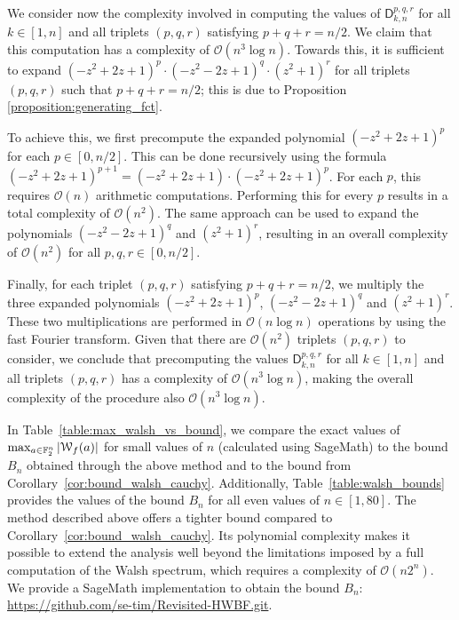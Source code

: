 \documentclass{llncs}
\begin{document}
We consider now the complexity involved in computing the values of $\mathsf{D}_{k,n}^{p,q,r}$ for all $k\in[1,n]$ and all triplets $(p,q,r)$ satisfying $p+q+r=n/2$. We claim that this computation has a complexity of $\mathcal{O}(n^3 \log n)$. Towards this, it is sufficient to expand $(-z^2 + 2z + 1)^p \cdot (-z^2 - 2z + 1)^q \cdot (z^2 + 1)^r$ for all triplets $(p,q,r)$ such that $p+q+r=n/2$; this is due to Proposition \ref{proposition:generating_fct}.

To achieve this, we first precompute the expanded polynomial $(-z^2 + 2z + 1)^p$ for each $p\in[0,n/2]$. This can be done recursively using the formula $(-z^2 + 2z + 1)^{p+1} = (-z^2 + 2z + 1) \cdot (-z^2 + 2z + 1)^p$. For each $p$, this requires $\mathcal O(n)$ arithmetic computations. Performing this for every $p$ results in a total complexity of $\mathcal{O}(n^2)$. The same approach can be used to expand the polynomials $(-z^2 - 2z + 1)^q$ and $(z^2 + 1)^r$, resulting in an overall complexity of $\mathcal{O}(n^2)$ for all $p,q,r\in[0,n/2]$. 

Finally, for each triplet $(p,q,r)$ satisfying $p+q+r=n/2$, we multiply the three expanded polynomials $(-z^2 + 2z + 1)^p$, $(-z^2 - 2z + 1)^q$ and $(z^2 + 1)^r$. These two multiplications are performed in $\mathcal{O}(n \log n)$ operations by using the fast Fourier transform. Given that there are $\mathcal{O}(n^2)$ triplets $(p,q,r)$ to consider, we conclude that precomputing the values $\mathsf{D}_{k,n}^{p,q,r}$ for all $k\in[1,n]$ and all triplets $(p,q,r)$ has a complexity of $\mathcal{O}(n^3 \log n)$, making the overall complexity of the procedure also $\mathcal{O}(n^3 \log n)$.

\bigskip

In Table~\ref{table:max_walsh_vs_bound}, we compare the exact values of $\max_{a\in\mathbb F_2^n}|\mathcal W_{f}(a)|$ for small values of $n$ (calculated using \textsf{SageMath}) to the bound $B_n$ obtained through the above method and to the bound from Corollary~\ref{cor:bound_walsh_cauchy}. Additionally, Table~\ref{table:walsh_bounds} provides the values of the bound $B_n$ for all even values of $n\in[1,80]$. The method described above offers a tighter bound compared to Corollary~\ref{cor:bound_walsh_cauchy}. Its polynomial complexity makes it possible to extend the analysis well beyond the limitations imposed by a full computation of the Walsh spectrum, which requires a complexity of $\mathcal O(n2^n)$.
\ifnum{}
	We provide a \textsf{SageMath} implementation to obtain the bound $B_n$: \url{https://github.com/se-tim/Revisited-HWBF.git}.
\fi
\end{document}
